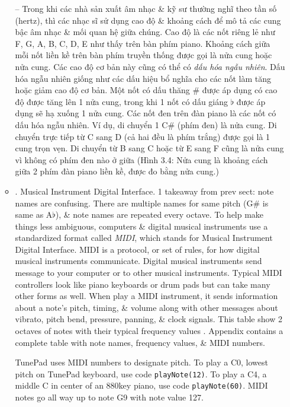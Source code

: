 \documentclass{article}
\begin{document}
\begin{itemize}
\begin{itemize}
		-- Trong khi các nhà sản xuất âm nhạc \& kỹ sư thường nghĩ theo tần số (hertz), thì các nhạc sĩ sử dụng cao độ \& khoảng cách để mô tả các cung bậc âm nhạc \& mối quan hệ giữa chúng. Cao độ là các nốt riêng lẻ như F, G, A, B, C, D, E như thấy trên bàn phím piano. Khoảng cách giữa mỗi nốt liền kề trên bàn phím truyền thống được gọi là nửa cung hoặc nửa cung. Các cao độ cơ bản này cũng có thể có {\it dấu hóa ngẫu nhiên}. Dấu hóa ngẫu nhiên giống như các dấu hiệu bổ nghĩa cho các nốt làm tăng hoặc giảm cao độ cơ bản. Một nốt có dấu thăng \# được áp dụng có cao độ được tăng lên 1 nửa cung, trong khi 1 nốt có dấu giáng $\flat$ được áp dụng sẽ hạ xuống 1 nửa cung. Các nốt đen trên đàn piano là các nốt có dấu hóa ngẫu nhiên. Ví dụ, di chuyển 1 C\# (phím đen) là nửa cung. Di chuyển trực tiếp từ C sang D (cả hai đều là phím trắng) được gọi là 1 cung trọn vẹn. Di chuyển từ B sang C hoặc từ E sang F cũng là nửa cung vì không có phím đen nào ở giữa ({\sf Hình 3.4: Nửa cung là khoảng cách giữa 2 phím đàn piano liền kề, được đo bằng nửa cung.})
		\item {. Musical Instrument Digital Interface.} 1 takeaway from prev sect: note names are confusing. There are multiple names for same pitch (G\# is same as A$\flat$), \& note names are repeated every octave. To help make things less ambiguous, computers \& digital musical instruments use a standardized format called {\it MIDI}, which stands for Musical Instrument Digital Interface. MIDI is a protocol, or set of rules, for how digital musical instruments communicate. Digital musical instruments send message to your computer or to other musical instruments. Typical MIDI controllers look like piano keyboards or drum pads but can take many other forms as well. When play a MIDI instrument, it sends information about a note's pitch, timing, \& volume along with other messages about vibrato, pitch bend, pressure, panning, \& clock signals. This table show 2 octaves of notes with their typical frequency values {\sf[Table]}. Appendix contains a complete table with note names, frequency values, \& MIDI numbers.
		
		TunePad uses MIDI numbers to designate pitch. To play a C0, lowest pitch on TunePad keyboard, use code {\tt playNote(12)}. To play a C4, a middle C in center of an 880key piano, use code {\tt playNote(60)}. MIDI notes go all way up to note G9 with note value 127.
		

\end{itemize}
\end{itemize}
\end{document}
